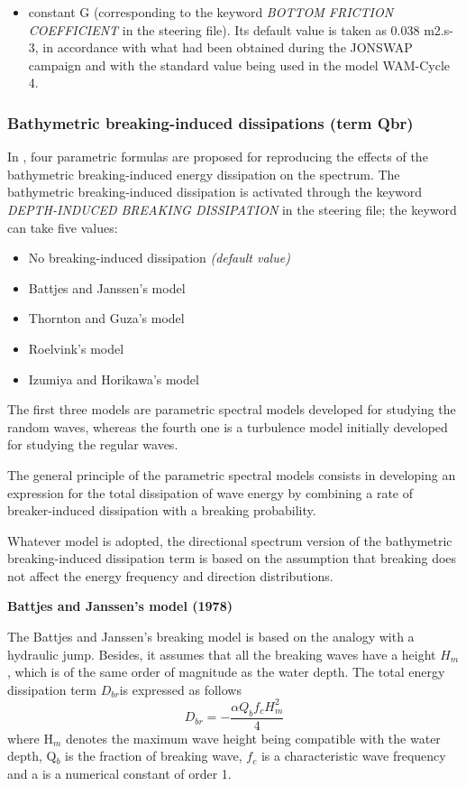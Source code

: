 \begin{itemize}
\item  constant G (corresponding to the keyword \textit{BOTTOM FRICTION COEFFICIENT} in the steering file). Its default value is taken as 0.038 m2.s-3, in accordance with what had been obtained during the JONSWAP campaign \cite{Hasselmann1973} and with the standard value being used in the model WAM-Cycle 4.
\end{itemize}

\subsubsection{ Bathymetric breaking-induced dissipations (term Qbr)}

 In \tomawac, four parametric formulas are proposed for reproducing the effects of the bathymetric breaking-induced energy dissipation on the spectrum. The bathymetric breaking-induced dissipation is activated through the keyword \textit{DEPTH-INDUCED BREAKING DISSIPATION} in the steering file; the keyword can take five values:

\begin{itemize}
\item  No breaking-induced dissipation \textit{(default value)}
\item  Battjes and Janssen's model \cite{Battjes1978}
\item  Thornton and Guza's model \cite{Thornton1983}
\item  Roelvink's model \cite{Roelvink1993}
\item  Izumiya and Horikawa's model \cite{Izumiya1984}
\end{itemize}

The first three models are parametric spectral models developed for studying the random waves, whereas the fourth one is a turbulence model initially developed for studying the regular waves.

 The general principle of the parametric spectral models consists in developing an expression for the total dissipation of wave energy by combining a rate of breaker-induced dissipation with a breaking probability.

 Whatever model is adopted, the directional spectrum version of the bathymetric breaking-induced dissipation term is based on the assumption that breaking does not affect the energy frequency and direction distributions.


{\bf  Battjes and Janssen's model (1978)}

 The Battjes and Janssen's breaking model \cite{Battjes1978} is based on the analogy with a hydraulic jump. Besides, it assumes that all the breaking waves have a height $H_{m} $, which is of the same order of magnitude as the water depth. The total energy dissipation term $D_{br} $is expressed as follows
\begin{equation} \label{GrindEQ__4_44_}
D_{br} =-\frac{\alpha Q_{b} f_{c} H_{m}^{2} }{4}
\end{equation}
where H${}_{m}$ denotes the maximum wave height being compatible with the water depth, Q${}_{b}$ is the fraction of breaking wave, $f_{c} $ is a characteristic wave frequency and a is a numerical constant of order 1.

